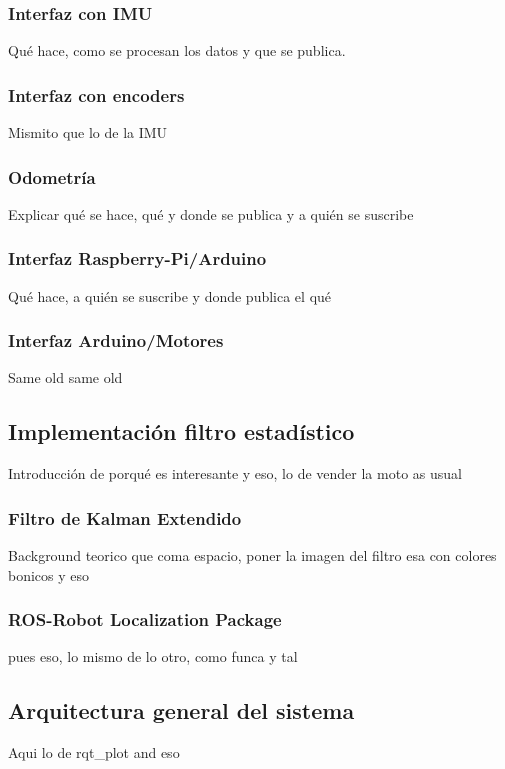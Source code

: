 \subsubsection{Interfaz con IMU}
Qué hace, como se procesan los datos y que se publica.
\subsubsection{Interfaz con encoders}
Mismito que lo de la IMU
\subsubsection{Odometría}
Explicar qué se hace, qué y donde se publica y a quién se suscribe
\subsubsection{Interfaz Raspberry-Pi/Arduino}
Qué hace, a quién se suscribe y donde publica el qué
\subsubsection{Interfaz Arduino/Motores}
Same old same old
\subsection{Implementación filtro estadístico}
Introducción de porqué es interesante y eso, lo de vender la moto as usual
\subsubsection{Filtro de Kalman Extendido}
Background teorico que coma espacio, poner la imagen del filtro esa con colores bonicos y eso
\subsubsection{ROS-Robot Localization Package}
pues eso, lo mismo de lo otro, como funca y tal
\subsection{Arquitectura general del sistema}
Aqui lo de rqt\_plot and eso
